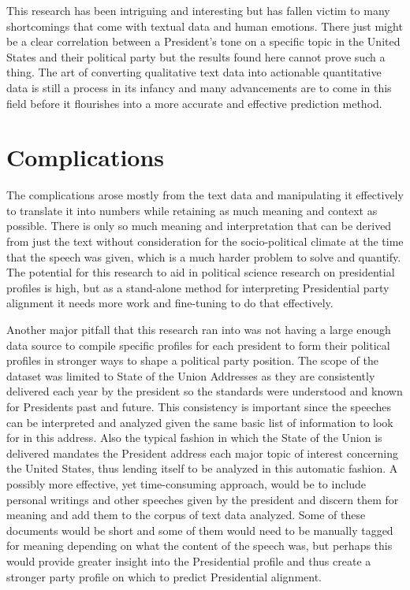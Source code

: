 This research has been intriguing and interesting but has fallen victim to many shortcomings that come with textual data and human emotions.
There just might be a clear correlation between a President's tone on a specific topic in the United States and their political party but the results found here cannot prove such a thing.
The art of converting qualitative text data into actionable quantitative data is still a process in its infancy and many advancements are to come in this field before it flourishes into a more accurate and effective prediction method.

\section{Complications}
The complications arose mostly from the text data and manipulating it effectively to translate it into numbers while retaining as much meaning and context as possible.
There is only so much meaning and interpretation that can be derived from just the text without consideration for the socio-political climate at the time that the speech was given, which is a much harder problem to solve and quantify.
The potential for this research to aid in political science research on presidential profiles is high, but as a stand-alone method for interpreting Presidential party alignment it needs more work and fine-tuning to do that effectively.

Another major pitfall that this research ran into was not having a large enough data source to compile specific profiles for each president to form their political profiles in stronger ways to shape a political party position.
The scope of the dataset was limited to State of the Union Addresses as they are consistently delivered each year by the president so the standards were understood and known for Presidents past and future.
This consistency is important since the speeches can be interpreted and analyzed given the same basic list of information to look for in this address.
Also the typical fashion in which the State of the Union is delivered mandates the President address each major topic of interest concerning the United States, thus lending itself to be analyzed in this automatic fashion.
A possibly more effective, yet time-consuming approach, would be to include personal writings and other speeches given by the president and discern them for meaning and add them to the corpus of text data analyzed.
Some of these documents would be short and some of them would need to be manually tagged for meaning depending on what the content of the speech was, but perhaps this would provide greater insight into the Presidential profile and thus create a stronger party profile on which to predict Presidential alignment.

